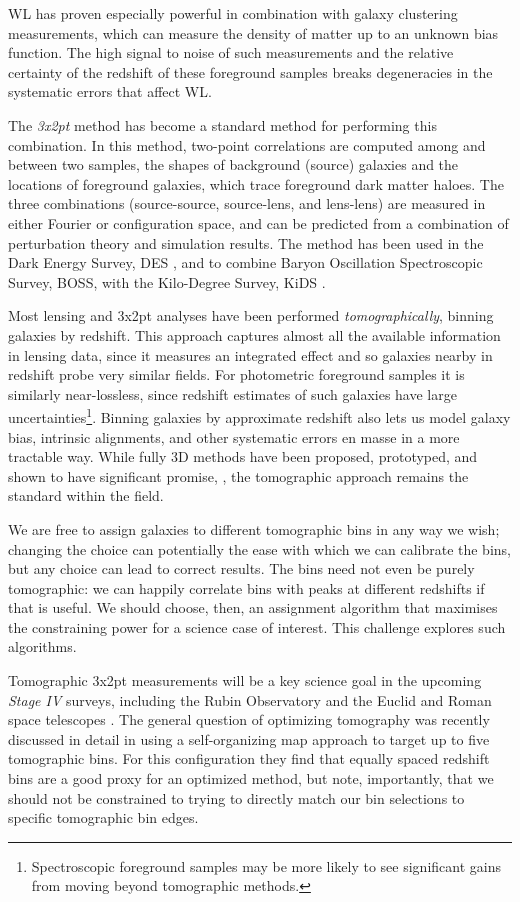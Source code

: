 \documentclass[twocolumn,twocolappendix]{aastex63}
\begin{document}
WL has proven especially powerful in combination with galaxy clustering measurements,
which can measure the density of matter up to an unknown bias function.  The high signal
to noise of such measurements and the relative certainty of the redshift of these foreground
samples breaks degeneracies in the systematic errors that affect WL.

The \emph{3x2pt} method has become a standard method for performing this combination.
In this method, two-point correlations are computed among and between two samples, the shapes of 
background (source) galaxies and the locations of foreground galaxies, which trace foreground
dark matter haloes.  The three combinations (source-source, source-lens, and lens-lens) are
measured in either Fourier or configuration space, and can be predicted from a combination of 
perturbation theory and simulation results.  The method has been used in the Dark Energy Survey, DES
\citep{des-3x2pt}, and to combine Baryon Oscillation Spectroscopic Survey, BOSS, with the Kilo-Degree 
Survey, KiDS \citep{kids-3x2pt}.

Most lensing and 3x2pt analyses have been performed \emph{tomographically}, 
binning galaxies by redshift.
This approach captures almost all the available information in lensing data, since it measures
an integrated effect and so galaxies nearby in redshift probe very similar fields.  For photometric
foreground samples it is similarly near-lossless, since redshift estimates of such galaxies have
large uncertainties\footnote{Spectroscopic foreground samples may be more likely to see significant 
gains from moving beyond tomographic methods.}.  Binning galaxies by approximate redshift also lets us 
model galaxy bias, intrinsic alignments, and other systematic errors en masse in a more tractable way.
While fully 3D methods have been proposed, prototyped, and shown to have significant promise, 
\citep{heavens,kitching}, the tomographic approach remains the standard within the field.

We are free to assign galaxies to different tomographic bins in any way we wish; changing the choice
can potentially the ease with which we can calibrate
the bins, but any choice can lead to correct results. The bins need not even be purely tomographic: we can happily correlate bins with peaks at different redshifts if that is useful.
We should choose, then, an assignment algorithm that maximises the constraining power for a science
case of interest.  This challenge explores such algorithms.

Tomographic 3x2pt measurements will be a key science goal in the upcoming \emph{Stage IV} surveys,
including the Rubin Observatory \citep{rubin} and the Euclid and Roman space telescopes
\citep{euclid,roman}. The general question of optimizing tomography was recently discussed in detail
in \citet{rainbow} using a self-organizing map approach to target up to five tomographic bins.  For this
configuration they find that equally spaced redshift bins are a good proxy
for an optimized method, but note, importantly, that we should not be constrained to trying to directly
match our bin selections to specific tomographic bin edges.
\end{document}
